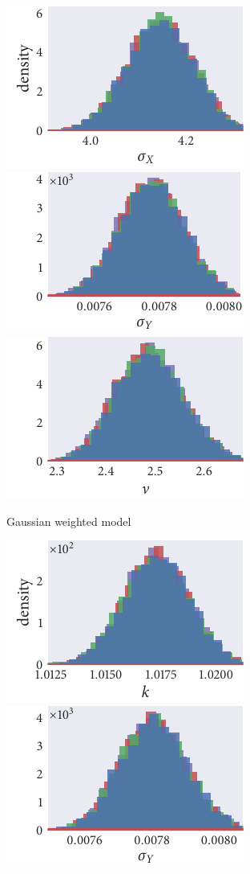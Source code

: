 \begin{figure}[p]
\begin{subfigure}[b]{\textwidth}
    \includegraphics{seq3/gauss_hist_sigma_X.pdf}%
    \includegraphics{seq3/gauss_hist_sigma_Y.pdf}%
    \includegraphics{seq3/gauss_hist_nu.pdf}
    \caption{Gaussian weighted model}
  \end{subfigure}
  \begin{subfigure}[b]{\textwidth}
    \includegraphics{seq3/top_hist_k.pdf}%
    \includegraphics{seq3/top_hist_sigma_Y.pdf}%

\end{subfigure}
\end{figure}
